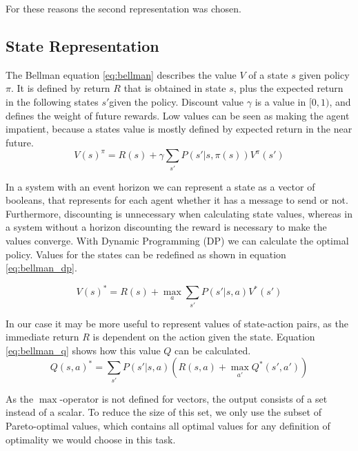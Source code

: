 \documentclass{article}
\begin{document}
\begin{multicols}{2}
		For these reasons the second representation was chosen.

		\subsection{State Representation}
		\label{sub:state_representation}
		The Bellman equation \ref{eq:bellman} describes the value $V$ of a state
		$s$ given policy $\pi$. It is defined by return $R$ that is obtained in
		state $s$, plus the expected return in the following states $s'$given the
		policy. Discount value $\gamma$ is a value in $[0, 1)$, and defines the
		weight of future rewards. Low values can be seen as making the agent
		impatient, because a states value is mostly defined by expected return in
		the near future.
		\begin{equation}
		\displaystyle
		V(s)^\pi = R(s) + \gamma\sum_{s'} P(s'|s, \pi(s)) V^\pi(s')
		\label{eq:bellman}
		\end{equation}

		In a system with an event horizon we can represent a state as a vector of
		booleans, that represents for each agent whether it has a message to send
		or not. Furthermore, discounting is unnecessary when calculating state
		values, whereas in a system without a horizon discounting the reward is
		necessary to make the values converge. With Dynamic Programming (DP) we
		can calculate the optimal policy. Values for the states can be redefined
		as shown in equation \ref{eq:bellman_dp}.

		\begin{equation}
		\displaystyle
		V(s)^* = R(s) + \max_a \sum_{s'} P(s'|s, a) V^*(s')
		\label{eq:bellman_dp}
		\end{equation}

		In our case it may be more useful to represent values of state-action
		pairs, as the immediate return $R$ is dependent on the action given the
		state. Equation \ref{eq:bellman_q} shows how this value $Q$ can be
		calculated.
		\begin{equation}
		\displaystyle
		Q(s, a)^* = \sum_{s'} P(s'|s, a) \left(R(s, a) + \max_{a'} Q^*(s', a')\right)
		\label{eq:bellman_q}
		\end{equation}

		As the $\max$-operator is not defined for vectors, the output consists of
		a set instead of a scalar. To reduce the size of this set, we only use
		the subset of Pareto-optimal values, which contains all optimal values
		for any definition of optimality we would choose in this task.


\end{multicols}
\end{document}
